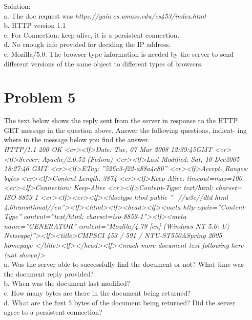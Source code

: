 \documentclass{article}
\begin{document}
\noindent Solution:\\
a. The doc request was \emph{https://gaia.cs.umass.edu/cs453/index.html} \\
b. HTTP version 1.1\\
c. For Connection: keep-alive, it is a persistent connection.\\
d. No enough info provided for deciding the IP address.\\
e. Mozilla/5.0. The browser type information is needed by the server to send different versions of the same object to different types of browsers.\\

\newpage
\section{Problem 5} The text below shows the reply sent from the server in response to the HTTP GET message in the question above. Answer the following questions, indicat- ing where in the message below you find the answer.\\
\emph{HTTP/1.1 200 OK \textless cr\textgreater  \textless lf\textgreater Date: Tue, 07 Mar 2008 12:39:45GMT \textless cr\textgreater  \textless lf\textgreater Server: Apache/2.0.52 (Fedora)  \textless cr\textgreater  \textless lf\textgreater Last-Modified: Sat, 10 Dec2005 18:27:46 GMT \textless cr\textgreater  \textless lf\textgreater ETag: ”526c3-f22-a88a4c80” \textless cr\textgreater  \textless lf\textgreater Accept- Ranges: bytes \textless cr\textgreater  \textless lf\textgreater Content-Length: 3874 \textless cr\textgreater  \textless lf\textgreater  Keep-Alive: timeout=max=100 \textless cr\textgreater  \textless lf\textgreater Connection: Keep-Alive \textless cr\textgreater  \textless lf\textgreater Content-Type: text/html; charset= ISO-8859-1 \textless cr\textgreater  \textless lf\textgreater  \textless cr\textgreater  \textless lf\textgreater  \textless !doctype html public ”- //w3c//dtd html 4.0transitional//en”\textgreater  \textless lf\textgreater  \textless html\textgreater  \textless lf\textgreater   \textless head\textgreater  \textless lf\textgreater   \textless meta http-equiv=”Content-Type” content=”text/html; charset=iso-8859-1”\textgreater  \textless lf\textgreater   \textless meta name=”GENERATOR” content=”Mozilla/4.79 [en] (Windows NT 5.0; U) Netscape]”\textgreater  \textless lf\textgreater   \textless title\textgreater CMPSCI 453 / 591 / NTU-ST550ASpring 2005 homepage \textless /title\textgreater  \textless lf\textgreater  \textless /head\textgreater  \textless lf\textgreater   \textless much more document text following here (not shown)\textgreater }\\
a. Was the server able to successfully find the document or not? What time was the document reply provided?\\
b. When was the document last modified?\\
c. How many bytes are there in the document being returned?\\
d. What are the first 5 bytes of the document being returned? Did the server agree to a persistent connection?\\
\end{document}
